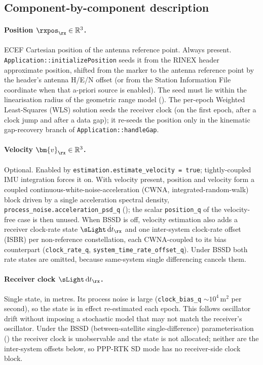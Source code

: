 \subsection{Component-by-component description}

\paragraph{Position $\rxpos_\rx \in \mathbb{R}^3$.}
ECEF Cartesian position of the antenna reference point.  Always present.
\texttt{Application::initializePosition} seeds it from the RINEX header
approximate position, shifted from the marker to the antenna reference
point by the header's antenna H/E/N offset (or from the Station
Information File coordinate when that a-priori source is enabled).  The
seed must lie within the linearisation radius of the geometric range
model ().  The per-epoch Weighted Least-Squares
(WLS) solution seeds the receiver clock (on the first epoch, after a
clock jump and after a data gap); it re-seeds the position only in the
kinematic gap-recovery branch of \texttt{Application::handleGap}.

\paragraph{Velocity $\bm{v}_\rx \in \mathbb{R}^3$.}
Optional.  Enabled by \texttt{estimation.estimate\_velocity = true};
tightly-coupled IMU integration forces it on.  With velocity present,
position and velocity form a coupled continuous-white-noise-acceleration
(CWNA, integrated-random-walk) block driven by a single acceleration
spectral density, \texttt{process\_noise.acceleration\_psd\_q}
(); the scalar \texttt{position\_q} of the velocity-free case is
then unused.  When BSSD is off, velocity estimation also adds a receiver
clock-rate state $\sLight\,\dot{\mathrm{d}t}_\rx$ and one inter-system
clock-rate offset (ISBR) per non-reference constellation, each
CWNA-coupled to its bias counterpart (\texttt{clock\_rate\_q},
\texttt{system\_time\_rate\_offset\_q}).  Under BSSD both rate states are
omitted, because same-system single differencing cancels them.

\paragraph{Receiver clock $\sLight\,\mathrm{d}t_\rx$.}
Single state, in metres.  Its process noise is large
(\texttt{clock\_bias\_q} $\sim 10^4\,\text{m}^2$ per second), so the
state is in effect re-estimated each epoch.  This follows oscillator
drift without imposing a stochastic model that may not match the
receiver's oscillator.  Under the BSSD (between-satellite
single-difference) parameterisation () the receiver clock
is unobservable and the state is not allocated; neither are the
inter-system offsets below, so PPP-RTK SD mode has no receiver-side clock
block.

